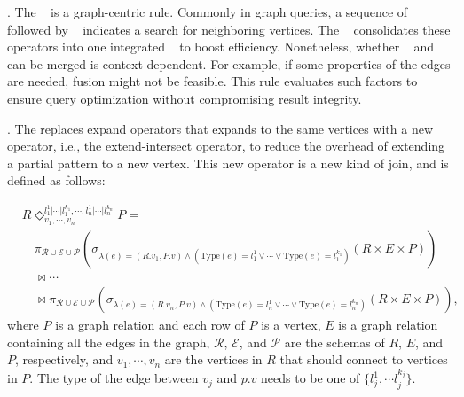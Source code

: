 \fusionrule. 
The \fusionrule~ is a graph-centric rule. 
Commonly in graph queries, a sequence of \expandedge~ followed by \getvertex~ indicates a search for neighboring vertices. 
The \fusionrule~ consolidates these operators into one integrated \expandvertex~ to boost efficiency. 
Nonetheless, whether \expandedge~ and \getvertex~ can be merged is context-dependent. 
For example, if some properties of the edges are needed, fusion might not be feasible.
This rule evaluates such factors to ensure query optimization without compromising result integrity.


\expandintersectrule.
The \expandintersectrule replaces expand operators that expands to the same vertices with a new operator, i.e., the extend-intersect operator, to reduce the overhead of extending a partial pattern to a new vertex.
This new operator is a new kind of join, and is defined as follows:

\begin{equation}
    \begin{split}
        & R \Diamond^{l_1^{1}|\cdots|l_1^{k_1}, \cdots, l_n^{1}|\cdots|l_n^{k_n}}_{v_1, \cdots, v_n} P = \\ 
        & \hspace{1em} \pi_{\mathcal{R} \cup \mathcal{E} \cup \mathcal{P}}(\sigma_{\lambda(e) = (R.v_1, P.v) \land (\text{Type}(e) = l_1^1 \lor \cdots \lor \text{Type}(e) = l_1^{k_1})}(R \times E \times P)) \\
        & \hspace{1em} \Join \cdots \\
        & \hspace{1em} \Join \pi_{\mathcal{R} \cup \mathcal{E} \cup \mathcal{P}}(\sigma_{\lambda(e) = (R.v_n, P.v) \land (\text{Type}(e) = l_n^1 \lor \cdots \lor \text{Type}(e) = l_n^{k_n})}(R \times E \times P)),
    \end{split}
\end{equation}
where $P$ is a graph relation and each row of $P$ is a vertex,
$E$ is a graph relation containing all the edges in the graph, 
$\mathcal{R}$, $\mathcal{E}$, and $\mathcal{P}$ are the schemas of $R$, $E$, and $P$, respectively,
and $v_1, \cdots, v_n$ are the vertices in $R$ that should connect to vertices in $P$.
The type of the edge between $v_j$ and $p.v$ needs to be one of $\{l_j^1, \cdots l_j^{k_j}\}$.

